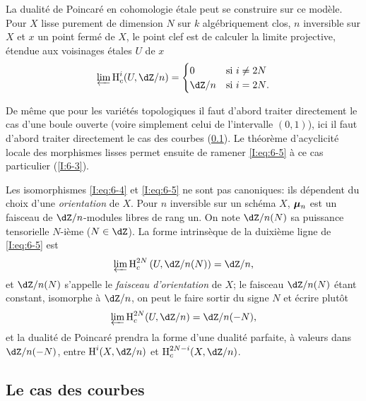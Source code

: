 La dualité de Poincaré en cohomologie étale peut se construire sur ce 
modèle. Pour $X$ lisse purement de dimension $N$ sur $k$ algébriquement clos, 
$n$ inversible sur $X$ et $x$ un point fermé de $X$, le point clef est de 
calculer la limite projective, étendue aux voisinages étales $U$ de $x$ 
\begin{equation}\label{I:eq:6-5}
  \varprojlim \h_c^i(U,\dZ/n) 
    = \begin{cases}
        0     & \text{si $i\ne 2N$} \\
        \dZ/n & \text{si $i=2N$.}
      \end{cases} 
\end{equation}

De même que pour les variétés topologiques il faut d'abord traiter 
directement le cas d'une boule ouverte (voire simplement celui de l'intervalle 
$(0,1)$), ici il faut d'abord traiter directement le cas des courbes 
(\ref{I:6-2}). Le théorème d'acyclicité locale des morphismes lisses 
permet ensuite de ramener \eqref{I:eq:6-5} à ce cas particulier (\ref{I:6-3}). 

Les isomorphismes \eqref{I:eq:6-4} et \eqref{I:eq:6-5} ne sont pas canoniques: 
ils dépendent du choix d'une \emph{orientation} de $X$. Pour $n$ inversible 
sur un schéma $X$, ${\bm\mu}_n$ est un faisceau de $\dZ/n$-modules libres de rang 
un. On note $\dZ/n(N)$ sa puissance tensorielle $N$-ième ($N\in\dZ$). La 
forme intrinsèque de la duixième ligne de \eqref{I:eq:6-5} est 
\begin{equation}\label{I:eq:6-5'}
  \varprojlim \h_c^{2N} \left(U,\dZ/n(N)\right) = \dZ/n \text{,}
\end{equation}
et $\dZ/n(N)$ s'appelle le \emph{faisceau d'orientation} de $X$; le faisceau 
$\dZ/n(N)$ étant constant, isomorphe à $\dZ/n$, on peut le faire sortir 
du signe $N$ et écrire plutôt
\begin{equation}\label{I:eq:6-5''}
  \varprojlim \h_c^{2N} (U,\dZ/n) = \dZ/n(-N) \text{,}
\end{equation}
et la dualité de Poincaré prendra la forme d'une dualité parfaite, à 
valeurs dans $\dZ/n(-N)$, entre $\h^i(X,\dZ/n)$ et $\h_c^{2N-i}(X,\dZ/n)$. 










\subsection{Le cas des courbes}\label{I:6-2}





